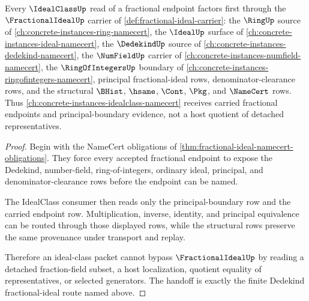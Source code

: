 \begin{theorem}\label{thm:fractional-ideal-dedekind-handoff}
Every $\IdealClassUp$ read of a fractional endpoint factors first through the $\FractionalIdealUp$ carrier of \autoref{def:fractional-ideal-carrier}: the $\RingUp$ source of \autoref{ch:concrete-instances-ring-namecert}, the $\IdealUp$ surface of \autoref{ch:concrete-instances-ideal-namecert}, the $\DedekindUp$ source of \autoref{ch:concrete-instances-dedekind-namecert}, the $\NumFieldUp$ carrier of \autoref{ch:concrete-instances-numfield-namecert}, the $\RingOfIntegersUp$ boundary of \autoref{ch:concrete-instances-ringofintegers-namecert}, principal fractional-ideal rows, denominator-clearance rows, and the structural $\BHist$, $\hsame$, $\Cont$, $\Pkg$, and $\NameCert$ rows. Thus \autoref{ch:concrete-instances-idealclass-namecert} receives carried fractional endpoints and principal-boundary evidence, not a host quotient of detached representatives.
\end{theorem}
\begin{proof}
Begin with the NameCert obligations of \autoref{thm:fractional-ideal-namecert-obligations}. They force every accepted fractional endpoint to expose the Dedekind, number-field, ring-of-integers, ordinary ideal, principal, and denominator-clearance rows before the endpoint can be named.

The IdealClass consumer then reads only the principal-boundary row and the carried endpoint row. Multiplication, inverse, identity, and principal equivalence can be routed through those displayed rows, while the structural rows preserve the same provenance under transport and replay.

Therefore an ideal-class packet cannot bypass $\FractionalIdealUp$ by reading a detached fraction-field subset, a host localization, quotient equality of representatives, or selected generators. The handoff is exactly the finite Dedekind fractional-ideal route named above.
\end{proof}



